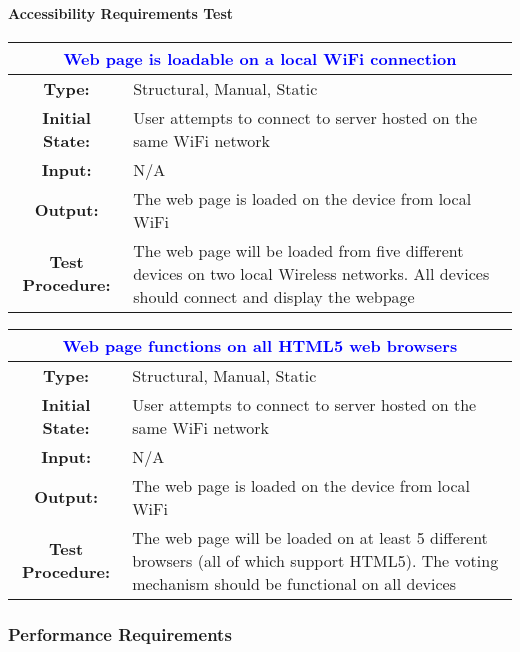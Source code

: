 \documentclass[12pt, titlepage]{article}
\begin{document}
\paragraph{Accessibility Requirements Test}

\begin{center}
\begin{table}[H]
\begin{tabularx}{\textwidth}{| c X |}
\hline
\multicolumn{2}{|c|}{\textbf{\textcolor{blue}{Web page is loadable on a local WiFi connection}}}\\
\hline
\textbf{Type: } & Structural, Manual, Static\\
\textbf{Initial State: } & User attempts to connect to server hosted on the same WiFi network\\
\textbf{Input: } & N/A\\
\textbf{Output: } & The web page is loaded on the device from local WiFi \\
\textbf{Test Procedure:  } & The web page will be loaded from five different devices on two local Wireless networks. All devices should connect and display the webpage \\
\hline
\end{tabularx}
\end{table}
\end{center}

\begin{center}
\begin{table}[H]
\begin{tabularx}{\textwidth}{| c X |}
\hline
\multicolumn{2}{|c|}{\textbf{\textcolor{blue}{Web page functions on all HTML5 web browsers}}}\\
\hline
\textbf{Type: } & Structural, Manual, Static\\
\textbf{Initial State: } & User attempts to connect to server hosted on the same WiFi network\\
\textbf{Input: } & N/A\\
\textbf{Output: } & The web page is loaded on the device from local WiFi \\
\textbf{Test Procedure:  } & The web page will be loaded on at least 5 different browsers (all of which support HTML5). The voting mechanism should be functional on all devices \\
\hline
\end{tabularx}
\end{table}
\end{center}

\subsubsection{Performance Requirements}
\end{document}
